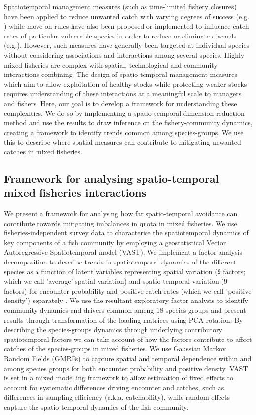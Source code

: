 \documentclass{nature}
\begin{document}
\begin{linenumbers}
Spatiotemporal management measures (such as time-limited fishery closures)
have been applied to reduce unwanted catch with varying degrees of success
(e.g.  \cite{Needle2011, Holmes2011, Beare2010, Dinmore2003}) while move-on
rules have also been proposed or implemented to influence catch rates of
particular vulnerable species in order to reduce or eliminate discards
(e.g.\cite{Gardner2008, Dunn2011, Dunn2014a}). However, such measures have
generally been targeted at individual species without considering associations
and interactions among several species. Highly mixed fisheries are complex with
spatial, technological and community interactions combining. The design of
spatio-temporal management measures which aim to allow exploitation of healthy
stocks while protecting weaker stocks requires understanding of these
interactions at a meaningful scale to managers and fishers. Here, our goal is
to develop a framework for understanding these complexities. We do so by
implementing a spatio-temporal dimension reduction method and use the results
to draw inference on the fishery-community dynamics, creating a framework to
identify trends common among species-groups. We use this to describe where
spatial measures can contribute to mitigating unwanted catches in mixed
fisheries.


\subsection{Framework for analysing spatio-temporal mixed fisheries
	interactions}

We present a framework for analysing how far spatio-temporal avoidance can
contribute towards mitigating imbalances in quota in mixed fisheries. We use
fisheries-independent survey data to characterise the spatiotemporal dynamics
of key components of a fish community by employing a geostatistical Vector
Autoregressive Spatiotemporal model (VAST). We implement a factor analysis
decomposition to describe trends in spatiotemporal dynamics of the different
species as a function of latent variables \cite{Thorson2015} representing
spatial variation (9 factors; which we call 'average' spatial variation) and
spatio-temporal variation (9 factors) for encounter probability and positive
catch rates (which we call 'positive density') separately \cite{Thorson2015a}.
We use the resultant exploratory factor analysis to identify community dynamics
and drivers common among 18 species-groups and present results through
transformation of the loading matrices using PCA rotation. By describing the
species-groups dynamics through underlying contributory spatiotemporal factors
we can take account of how the factors contribute to affect catches of the
species-groups in mixed fisheries. We use Gaussian Markov Random Fields (GMRFs)
to capture spatial and temporal dependence within and among species groups for
both encounter probability and positive density\cite{Thorson2013}. VAST is set
in a mixed modelling framework to allow estimation of fixed effects to account
for systematic differences driving encounter and catches, such as differences
in sampling efficiency (a.k.a.  catchability), while random effects capture the
spatio-temporal dynamics of the fish community.


\end{linenumbers}
\end{document}
